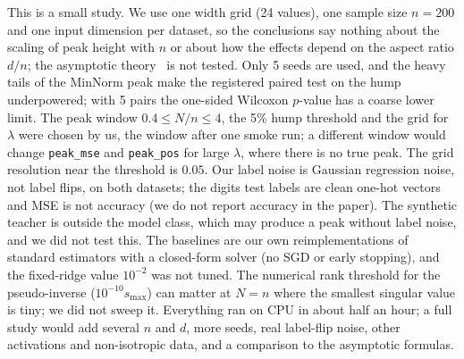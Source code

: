 This is a small study. We use one width grid (24 values), one sample size $n=200$ and one input dimension per dataset, so the conclusions say nothing about the scaling of peak height with $n$ or about how the effects depend on the aspect ratio $d/n$; the asymptotic theory~\cite{mei2019generalization} is not tested. Only 5 seeds are used, and the heavy tails of the MinNorm peak make the registered paired test on the hump underpowered; with 5 pairs the one-sided Wilcoxon $p$-value has a coarse lower limit. The peak window $0.4\le N/n\le4$, the 5\% hump threshold and the grid for $\lambda$ were chosen by us, the window after one smoke run; a different window would change \texttt{peak\_mse} and \texttt{peak\_pos} for large $\lambda$, where there is no true peak. The grid resolution near the threshold is $0.05$. Our label noise is Gaussian regression noise, not label flips, on both datasets; the digits test labels are clean one-hot vectors and MSE is not accuracy (we do not report accuracy in the paper). The synthetic teacher is outside the model class, which may produce a peak without label noise, and we did not test this. The baselines are our own reimplementations of standard estimators with a closed-form solver (no SGD or early stopping), and the fixed-ridge value $10^{-2}$ was not tuned. The numerical rank threshold for the pseudo-inverse ($10^{-10}s_{\max}$) can matter at $N=n$ where the smallest singular value is tiny; we did not sweep it. Everything ran on CPU in about half an hour; a full study would add several $n$ and $d$, more seeds, real label-flip noise, other activations and non-isotropic data, and a comparison to the asymptotic formulas.
